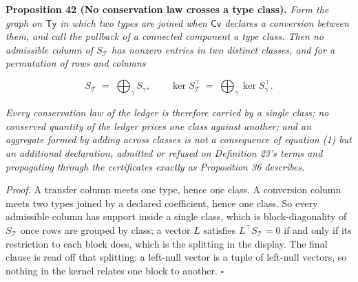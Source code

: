 \documentclass[11pt]{article}
\begin{document}
\textbf{Proposition 42 (No conservation law crosses a type class).} \emph{Form the graph on \(\mathsf{Ty}\) in which two types are joined when \(\mathsf{Cv}\) declares a conversion between them, and call the pullback of a connected component a type class. Then no admissible column of \(S_{\mathcal{T}}\) has nonzero entries in two distinct classes, and for a permutation of rows and columns} 

$$S_{\mathcal{T}} \;=\; \bigoplus_{\gamma} S_{\gamma}, \qquad \ker S_{\mathcal{T}}^{\top} \;=\; \bigoplus_{\gamma} \ker S_{\gamma}^{\top} .$$

 \emph{Every conservation law of the ledger is therefore carried by a single class; no conserved quantity of the ledger prices one class against another; and an aggregate formed by adding across classes is not a consequence of equation (1) but an additional declaration, admitted or refused on Definition 23's terms and propagating through the certificates exactly as Proposition 36 describes.}

\emph{Proof.} A transfer column meets one type, hence one class. A conversion column meets two types joined by a declared coefficient, hence one class. So every admissible column has support inside a single class, which is block-diagonality of \(S_{\mathcal{T}}\) once rows are grouped by class; a vector \(L\) satisfies \(L^{\top} S_{\mathcal{T}} = 0\) if and only if its restriction to each block does, which is the splitting in the display. The final clause is read off that splitting: a left-null vector is a tuple of left-null vectors, so nothing in the kernel relates one block to another. \(\square\)
\end{document}
